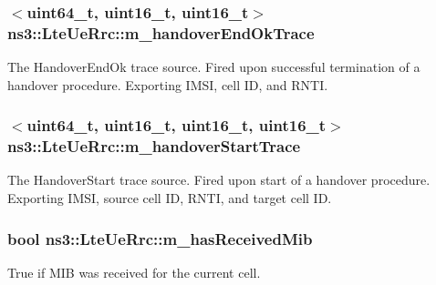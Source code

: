 \subsubsection[{\texorpdfstring{m\+\_\+handover\+End\+Ok\+Trace}{m_handoverEndOkTrace}}]{$<$uint64\+\_\+t, uint16\+\_\+t, uint16\+\_\+t$>$ ns3\+::\+Lte\+Ue\+Rrc\+::m\+\_\+handover\+End\+Ok\+Trace\hspace{0.3cm}{\ttfamily [private]}}\hypertarget{classns3_1_1LteUeRrc_a72e8b2d3a4b7a8b0dcb3c66d91ec0f79}{}\label{classns3_1_1LteUeRrc_a72e8b2d3a4b7a8b0dcb3c66d91ec0f79}
The {\ttfamily Handover\+End\+Ok} trace source. Fired upon successful termination of a handover procedure. Exporting I\+M\+SI, cell ID, and R\+N\+TI. 
\subsubsection[{\texorpdfstring{m\+\_\+handover\+Start\+Trace}{m_handoverStartTrace}}]{$<$uint64\+\_\+t, uint16\+\_\+t, uint16\+\_\+t, uint16\+\_\+t$>$ ns3\+::\+Lte\+Ue\+Rrc\+::m\+\_\+handover\+Start\+Trace\hspace{0.3cm}{\ttfamily [private]}}\hypertarget{classns3_1_1LteUeRrc_afdfd3280326e69183947c7f70bf72d11}{}\label{classns3_1_1LteUeRrc_afdfd3280326e69183947c7f70bf72d11}
The {\ttfamily Handover\+Start} trace source. Fired upon start of a handover procedure. Exporting I\+M\+SI, source cell ID, R\+N\+TI, and target cell ID. 
\subsubsection[{\texorpdfstring{m\+\_\+has\+Received\+Mib}{m_hasReceivedMib}}]{\setlength{\rightskip}{0pt plus 5cm}bool ns3\+::\+Lte\+Ue\+Rrc\+::m\+\_\+has\+Received\+Mib\hspace{0.3cm}{\ttfamily [private]}}\hypertarget{classns3_1_1LteUeRrc_abcd8b45c6f3ad56f3459e274c79c035e}{}\label{classns3_1_1LteUeRrc_abcd8b45c6f3ad56f3459e274c79c035e}


True if M\+IB was received for the current cell. 

